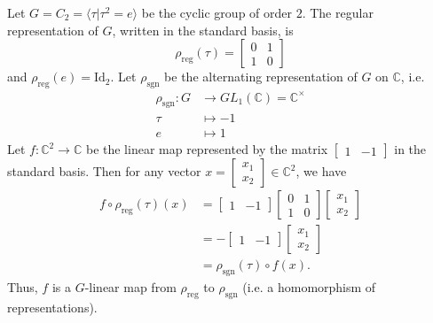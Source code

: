 \begin{example} \label{basic-example-of-hom-of-reps}
Let $G = C_2 = \langle \tau | \tau^2 = e \rangle$ be the cyclic group of order $2$.  The regular representation of $G$, written in the standard basis, is 
\[ \rho_{\text{reg}}(\tau)= \begin{bmatrix} 0 & 1 \\ 1 & 0 \end{bmatrix} \]
and $\rho_{\text{reg}}(e) = \text{Id}_2$.  Let $\rho_{\text{sgn}}$ be the alternating representation of $G$ on $\mathbb{C}$, i.e.
\begin{align*}
 \rho_{\text{sgn}} \colon G &\to GL_1 (\mathbb{C}) = \mathbb{C} ^ {\times} \\
\tau &\mapsto -1 \\
e &\mapsto 1
 \end{align*}
Let $f \colon \mathbb{C}^2 \to \mathbb{C}$ be the linear map represented by the matrix $\begin{bmatrix} 1 & -1 \end{bmatrix}$ in the standard basis.  Then for any vector $x = \begin{bmatrix}x_1 \\ x_2 \end{bmatrix} \in \mathbb{C}^2$, we have 
\begin{align*}
f \circ \rho_{\text{reg}} (\tau) (x) &= \begin{bmatrix} 1 & -1 \end{bmatrix}  \begin{bmatrix} 0 & 1 \\ 1 & 0 \end{bmatrix}  \begin{bmatrix}x_1 \\ x_2 \end{bmatrix}  \\
&= - \begin{bmatrix} 1 & -1 \end{bmatrix}  \begin{bmatrix}x_1 \\ x_2 \end{bmatrix} \\
&= \rho_{\text{sgn}} (\tau) \circ f(x).
\end{align*}
Thus, $f$ is a $G$-linear map from $\rho_{\text{reg}}$ to $\rho_{\text{sgn}}$ (i.e. a homomorphism of representations).  


\end{example}
